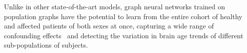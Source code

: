 Unlike in other state-of-the-art models, graph neural networks trained on population graphs have the potential to learn from the entire cohort of healthy and affected patients of both sexes at once, capturing a wide range of confounding effects~\cite{ruigrok2014meta} and detecting the variation in brain age trends of different sub-populations of subjects. 







